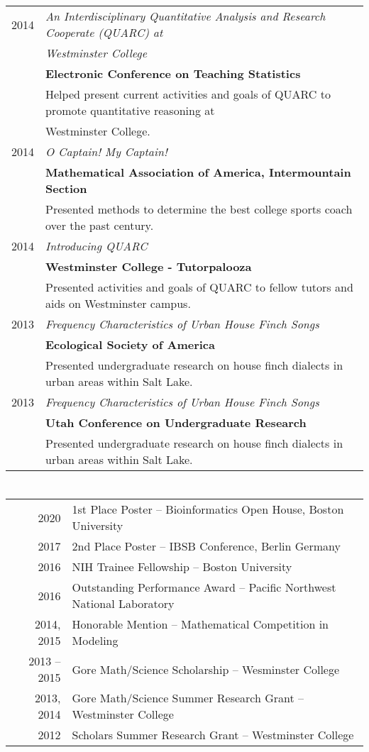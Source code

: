 \documentclass[a4paper,10pt]{article}
\begin{document}
\begin{tabular}{rl}
\textsc{2014}& \emph{An Interdisciplinary Quantitative Analysis and Research Cooperate (QUARC) at} \\
&\emph{Westminster College}
\\ & \textbf{Electronic Conference on Teaching Statistics}
\\ & \small{Helped present current activities and goals of QUARC to promote quantitative reasoning at}
\\ &\small{ Westminster College.} \\

\textsc{2014}& \emph{O Captain! My Captain!}
\\& \textbf{Mathematical Association of America, Intermountain Section}
\\& \small{Presented methods to determine the best college sports coach over
           the past century.}  \\

\textsc{2014} &\emph{Introducing QUARC}
\\& \textbf{Westminster College - Tutorpalooza}
\\& \small{Presented activities and goals of QUARC to fellow tutors and aids on
           Westminster campus.} \\

\textsc{2013}& \emph{Frequency Characteristics of Urban House Finch Songs}
\\& \textbf{Ecological Society of America}
\\& \small{Presented undergraduate research on house finch dialects in urban
           areas within Salt Lake.} \\

\textsc{2013}& \emph{Frequency Characteristics of Urban House Finch Songs}
\\& \textbf{Utah Conference on Undergraduate Research}
\\& \small{Presented undergraduate research on house finch dialects in urban
           areas within Salt Lake.}
\end{tabular}

\section{\color{linkcolour}{Awards and Accolades}}
\begin{tabular}{rl}
2020 & 1st Place Poster -- Bioinformatics Open House, Boston University \\ 
2017 & 2nd Place Poster -- IBSB Conference, Berlin Germany \\
2016 & NIH Trainee Fellowship -- Boston University \\
2016 & Outstanding Performance Award -- Pacific Northwest National Laboratory \\
2014, 2015 & Honorable Mention -- Mathematical Competition in Modeling \\
2013 -- 2015 &  Gore Math/Science Scholarship -- Wesminster College \\
2013, 2014 & Gore Math/Science Summer Research Grant -- Westminster College \\
2012 & Scholars Summer Research Grant -- Westminster College
\end{tabular}
\end{document}
